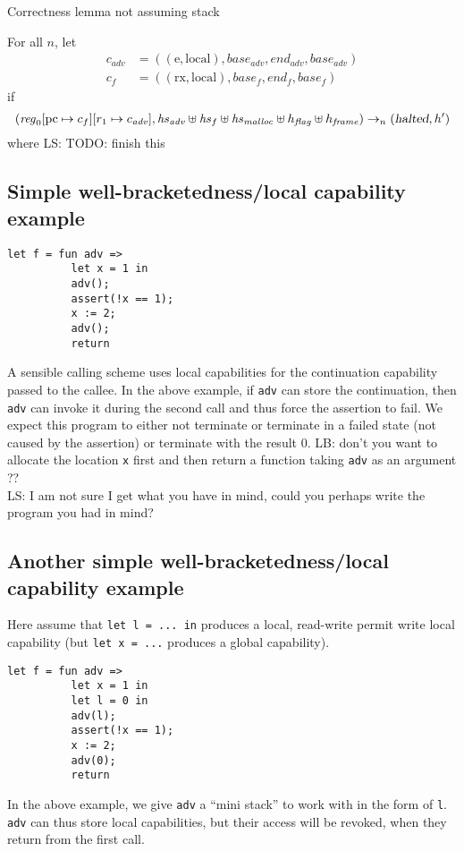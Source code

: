 \documentclass[a4paper]{article}
\newcommand{\update}[2]{[#1 \mapsto #2]}
\newcommand\lau[1]{{\color{purple} \sf \footnotesize {LS: #1}}\\}
\newcommand\lars[1]{{\color{purple} \sf \footnotesize {LB: #1}}\\}
\newcommand{\var}[1]{\mathit{#1}}
\newcommand{\hs}{\var{hs}}
\newcommand{\pcreg}{\mathrm{pc}}
\newcommand{\start}{\var{base}}
\newcommand{\addrend}{\var{end}}
\newcommand{\reg}{\var{reg}}
\newcommand{\adv}{\var{adv}}
\newcommand{\flag}{\var{flag}}
\newcommand{\halted}{\textsl{halted}}
\newcommand{\codelabel}[1]{\mathit{#1}}
\newcommand{\malloc}{\codelabel{malloc}}
\newcommand{\plainperm}[1]{\mathrm{#1}}
\newcommand{\exec}{\plainperm{rx}}
\newcommand{\entry}{\plainperm{e}}
\newcommand{\local}{\plainperm{local}}
\newcommand{\step}[1][]{\rightarrow_{#1}}
\begin{document}
Correctness lemma not assuming stack
\begin{lemma}
  For all $n$,
  let
  \begin{align*}
    c_\adv & = ((\entry,\local),\start_\adv,\addrend_\adv,\start_\adv) \\
    c_f & = ((\exec,\local),\start_f,\addrend_f,\start_f)
  \end{align*}
  if
  \[
    (\reg_0\update{\pcreg}{c_f}\update{r_1}{c_\adv},\hs_\adv \uplus \hs_f \uplus \hs_\malloc \uplus h_\flag \uplus h_\var{frame}) \step[n] (\halted, h')
  \]
  where
\lau{TODO: finish this}
\end{lemma}


\subsection{Simple well-bracketedness/local capability example}
\begin{verbatim}
let f = fun adv =>
          let x = 1 in
          adv();
          assert(!x == 1);
          x := 2;
          adv();
          return
\end{verbatim}
A sensible calling scheme uses local capabilities for the continuation capability passed to the callee. In the above example, if \texttt{adv} can store the continuation, then 
\texttt{adv} can invoke it during the second call and thus force the assertion to fail. We expect this program to either not terminate or terminate in a failed state (not caused by the assertion) or terminate with the result 0.
\lars{don't you want to allocate the location \texttt{x} first and then
  return a function taking \texttt{adv} as an argument ??}
\lau{I am not sure I get what you have in mind, could you perhaps write the program you had in mind?}

\subsection{Another simple well-bracketedness/local capability example}
Here assume that \texttt{let l = ... in} produces a local, read-write permit write local capability (but \texttt{let x = ...} produces a global capability). 
\begin{verbatim}
let f = fun adv =>
          let x = 1 in
          let l = 0 in
          adv(l);
          assert(!x == 1);
          x := 2;
          adv(0);
          return
\end{verbatim}
In the above example, we give \texttt{adv} a ``mini stack'' to work with in the form of \texttt{l}. \texttt{adv} can thus store local capabilities, but their access will be revoked, when they return from the first call.
\end{document}
